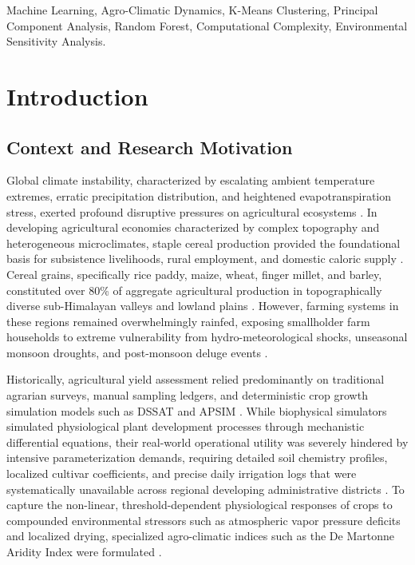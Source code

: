 \documentclass[conference]{IEEEtran}
\begin{document}
\begin{IEEEkeywords}
Machine Learning, Agro-Climatic Dynamics, K-Means Clustering, Principal Component Analysis, Random Forest, Computational Complexity, Environmental Sensitivity Analysis.
\end{IEEEkeywords}

\section{Introduction}

\subsection{Context and Research Motivation}
Global climate instability, characterized by escalating ambient temperature extremes, erratic precipitation distribution, and heightened evapotranspiration stress, exerted profound disruptive pressures on agricultural ecosystems \cite{dhakal2023, crane2018}. In developing agricultural economies characterized by complex topography and heterogeneous microclimates, staple cereal production provided the foundational basis for subsistence livelihoods, rural employment, and domestic caloric supply \cite{dhakal2023, fernandez2021}. Cereal grains, specifically rice paddy, maize, wheat, finger millet, and barley, constituted over 80\% of aggregate agricultural production in topographically diverse sub-Himalayan valleys and lowland plains \cite{dhakal2023}. However, farming systems in these regions remained overwhelmingly rainfed, exposing smallholder farm households to extreme vulnerability from hydro-meteorological shocks, unseasonal monsoon droughts, and post-monsoon deluge events \cite{fernandez2021}.

Historically, agricultural yield assessment relied predominantly on traditional agrarian surveys, manual sampling ledgers, and deterministic crop growth simulation models such as DSSAT and APSIM \cite{crane2018}. While biophysical simulators simulated physiological plant development processes through mechanistic differential equations, their real-world operational utility was severely hindered by intensive parameterization demands, requiring detailed soil chemistry profiles, localized cultivar coefficients, and precise daily irrigation logs that were systematically unavailable across regional developing administrative districts \cite{crane2018, fernandez2021}. To capture the non-linear, threshold-dependent physiological responses of crops to compounded environmental stressors such as atmospheric vapor pressure deficits and localized drying, specialized agro-climatic indices such as the De Martonne Aridity Index were formulated \cite{demartonne1926}.
\end{document}
